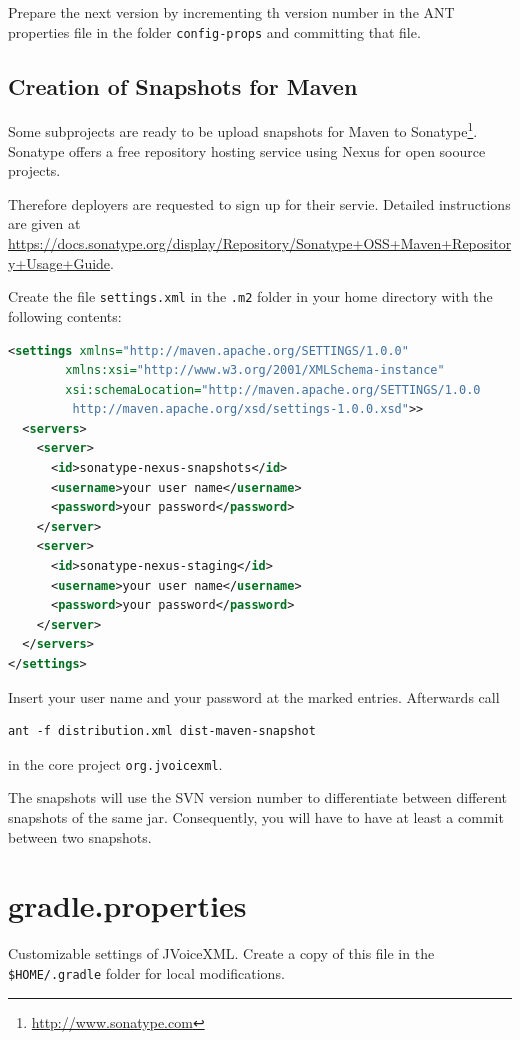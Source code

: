 \documentclass[11pt,a4paper]{article}
\begin{document}
Prepare the next version by incrementing th version number in the ANT
properties file in the folder \texttt{config-props} and committing that file.

\subsection{Creation of Snapshots for Maven}

Some subprojects are ready to be upload snapshots for Maven to
Sonatype\footnote{\url{http://www.sonatype.com}}. Sonatype offers
a free repository hosting service using Nexus for open soource projects.

Therefore deployers are requested to sign up for their servie. Detailed
instructions are given at \url{https://docs.sonatype.org/display/Repository/Sonatype+OSS+Maven+Repository+Usage+Guide}.

Create the file \texttt{settings.xml} in the \texttt{.m2} folder in your
home directory with the following contents:

\begin{lstlisting}[language=XML]
<settings xmlns="http://maven.apache.org/SETTINGS/1.0.0"
        xmlns:xsi="http://www.w3.org/2001/XMLSchema-instance"
        xsi:schemaLocation="http://maven.apache.org/SETTINGS/1.0.0
         http://maven.apache.org/xsd/settings-1.0.0.xsd">>
  <servers>
    <server>
      <id>sonatype-nexus-snapshots</id>
      <username>your user name</username>
      <password>your password</password>
    </server>
    <server>
      <id>sonatype-nexus-staging</id>
      <username>your user name</username>
      <password>your password</password>
    </server>
  </servers>
</settings>
\end{lstlisting}

Insert your user name and your password at the marked entries.
Afterwards call 
\begin{lstlisting}
ant -f distribution.xml dist-maven-snapshot
\end{lstlisting}
in the core project \lstinline{org.jvoicexml}.

The snapshots will use the SVN version number to differentiate between different
snapshots of the same jar. Consequently, you will have to have at least
a commit between two snapshots.



\newpage

\appendix

\section{gradle.properties}
\label{sec:gradle-properties}

Customizable settings of JVoiceXML. Create a copy of this file in the
\texttt{\$HOME/.gradle} folder for local modifications.


\end{document}

